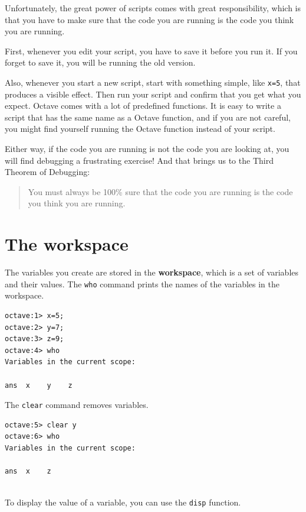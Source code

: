 \documentclass{book}
\begin{document}
Unfortunately, the great power of scripts comes with great responsibility,
which is that you have to make sure that the code you are running is
the code you think you are running.

First, whenever you edit your script, you have to save it before you
run it. If you forget to save it, you will be running the old version.

Also, whenever you start a new script, start with something simple,
like {\tt x=5}, that produces a visible effect. Then run your script
and confirm that you get what you expect. Octave comes with a lot of
predefined functions. It is easy to write a script that has the same
name as a Octave function, and if you are not careful, you might
find yourself running the Octave function instead of your script.

Either way, if the code you are running is not the code you are looking
at, you will find debugging a frustrating exercise! And that brings
us to the Third Theorem of Debugging:

\begin{quote}
You must always be 100\% sure that the code you are running is
the code you think you are running.
\end{quote}



\section{The workspace}

The variables you create are stored in the {\bf workspace}, which is a
set of variables and their values. The {\tt who} command prints the
names of the variables in the workspace.

\begin{verbatim}
octave:1> x=5;
octave:2> y=7;
octave:3> z=9;
octave:4> who
Variables in the current scope:

ans  x    y    z

\end{verbatim}

The {\tt clear} command removes variables.

\begin{verbatim}
octave:5> clear y
octave:6> who
Variables in the current scope:

ans  x    z


\end{verbatim}

To display the value of a variable, you can use the {\tt disp}
function.
\end{document}
